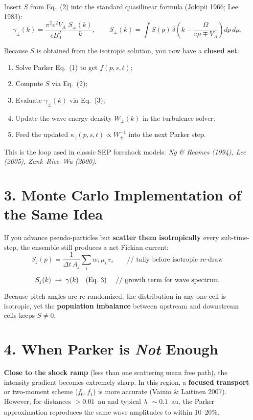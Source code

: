 Insert $S$ from Eq.~(2) into the standard quasilinear formula (Jokipii 1966; Lee 1983):
\begin{equation}
\boxed{
\gamma_\pm(k) = \frac{\pi^2 e^2 V_A}{c B_0^2} \,
\frac{S_\pm(k)}{k}}, \qquad
S_\pm(k) = \int S(p) \, \delta \left( k - \frac{\Omega}{v \mu \mp V_A} \right) dp\,d\mu.
\tag{3}
\end{equation}

Because $S$ is obtained from the isotropic solution, you now have a \textbf{closed set}:
\begin{enumerate}
    \item Solve Parker Eq.~(1) to get $f(p,s,t)$;
    \item Compute $S$ via Eq.~(2);
    \item Evaluate $\gamma_\pm(k)$ via Eq.~(3);
    \item Update the wave energy density $W_\pm(k)$ in the turbulence solver;
    \item Feed the updated $\kappa_\parallel(p,s,t) \propto W_\pm^{-1}$ into the next Parker step.
\end{enumerate}

This is the loop used in classic SEP foreshock models: \textit{Ng \& Reames (1994), Lee (2005), Zank–Rice–Wu (2000)}.

\section*{3. Monte Carlo Implementation of the Same Idea}

If you advance pseudo-particles but \textbf{scatter them isotropically} every sub-time-step, the ensemble still produces a net Fickian current:
\[
S_j(p) = \frac{1}{\Delta t \, A_j} \sum_i w_i\, \mu_i\, v_i
\qquad\text{// tally before isotropic re-draw}
\]

\[
S_j(k) \;\rightarrow\; \gamma(k) \quad\text{(Eq.~3) \quad // growth term for wave spectrum}
\]

Because pitch angles are re-randomized, the distribution in any one cell is isotropic, yet the \textbf{population imbalance} between upstream and downstream cells keeps $S \neq 0$.

\section*{4. When Parker is \textit{Not} Enough}

\textbf{Close to the shock ramp} (less than one scattering mean free path), the intensity gradient becomes extremely sharp. In this region, a \textbf{focused transport} or two-moment scheme ($f_0, f_1$) is more accurate (Vainio \& Laitinen 2007). However, for distances $>0.01$~au and typical $\lambda_\parallel \sim 0.1$~au, the Parker approximation reproduces the same wave amplitudes to within 10--20\%.

